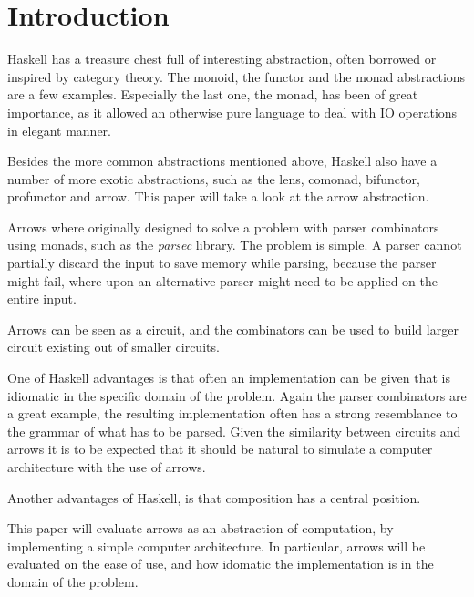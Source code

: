 \documentclass[a4paper,12pt]{article}
\begin{document}

\section{Introduction}

Haskell has a treasure chest full of interesting abstraction, often borrowed or
inspired by category theory. The monoid, the functor and the monad abstractions are a few
examples. Especially the last one, the monad, has been of great importance, as
it allowed an otherwise pure language to deal with IO operations in elegant
manner. 

Besides the more common abstractions mentioned above, Haskell also have a number
of more exotic abstractions, such as the lens, comonad, bifunctor, profunctor
and arrow. This paper will take a look at the arrow abstraction.

Arrows where originally designed to solve a problem with parser combinators
using monads, such as the \emph{parsec} library. The problem is simple. 
A parser cannot partially discard the input to save memory while parsing,
because the parser might fail, where upon an alternative parser might need to be
applied on the entire input.

Arrows can be seen as a circuit, and the combinators can be used
to build larger circuit existing out of smaller circuits. 

One of Haskell advantages is that often an implementation can be given that is
idiomatic in the specific domain of the problem. Again the parser combinators
are a great example, the resulting implementation often has a strong resemblance
to the grammar of what has to be parsed. Given the similarity between circuits
and arrows it is to be expected that it should be natural to simulate a computer
architecture with the use of arrows.

Another advantages of Haskell, is that composition has a central position. 

This paper will evaluate arrows as an abstraction of computation, by implementing a simple
computer architecture. In particular, arrows will be evaluated on the ease of
use, and how idomatic the implementation is in the domain of the problem.
\end{document}

